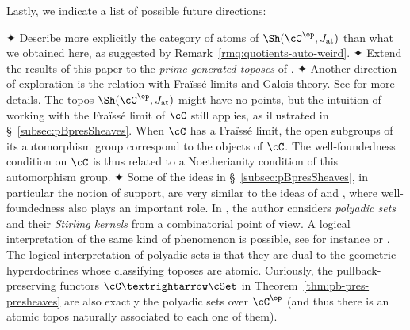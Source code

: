 \documentclass[numberwithin=section]{papier}
\newcommand{\at}{\mathrm{at}}
\begin{document}
Lastly, we indicate a list of possible future directions:
\begin{enumerate}
	✦ Describe more explicitly the category of atoms of $\Sh(\cC^\op,J_\at)$ than what we obtained here, as suggested by Remark~\ref{rmq:quotients-auto-weird}.
	✦ Extend the results of this paper to the \emph{prime-generated toposes} of \cite{makkaiFullContinuousEmbeddings1982}.
	✦ Another direction of exploration is the relation with Fraïssé limits and Galois theory. See \cite{FraisseConstructionToposTheoreticCar2014,AspectsTopologicalGaloisCarLaf2019} for more details. The topos $\Sh(\cC^\op,J_\at)$ might have no points, but the intuition of working with the Fraïssé limit of $\cC$ still applies, as illustrated in §~\ref{subsec:pBpresSheaves}. When $\cC$ has a Fraïssé limit, the open subgroups of its automorphism group correspond to the objects of $\cC$. The well-foundedness condition on $\cC$ is thus related to a Noetherianity condition of this automorphism group. %
	✦ Some of the ideas in §~\ref{subsec:pBpresSheaves}, in particular the notion of support, are very similar to the ideas of \cite{NotesCombinatorialFunctorsFio2001,ReflectiveKleisliSubcategoriesFioMen2005} and \cite{PolyadicSetsHomomorphismReg2022}, where well-foundedness also plays an important role. In \cite{PolyadicSetsHomomorphismReg2022}, the author considers \emph{polyadic sets} and their \emph{Stirling kernels} from a combinatorial point of view. A logical interpretation of the same kind of phenomenon is possible, see for instance \cite{PolyadicSpacesProfiniteMar2021} or \cite[Chap.~5]{LogiqueCategoriquePointMar2023}. The logical interpretation of polyadic sets is that they are dual to the geometric hyperdoctrines whose classifying toposes are atomic. Curiously, the pullback-preserving functors $\cC→\cSet$ in Theorem~\ref{thm:pb-pres-presheaves} are also exactly the polyadic sets over $\cC^\op$ (and thus there is an atomic topos naturally associated to each one of them).
\end{enumerate}

\AtNextBibliography{\small}
{\printbibliography[
heading=bibintoc,
title={References}
]}
\end{document}
